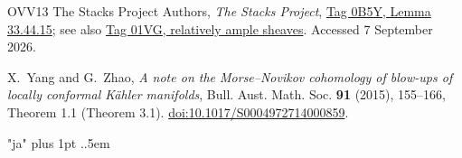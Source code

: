 \documentclass[12pt]{amsart}
\makeatletter
\theoremstyle{definition}
\theoremstyle{remark}
\numberwithin{equation}{section}
\newcommand{\MergedLanguage}{en}
\let\MergedSetAbstract\@setabstract
\newcommand{\MergedBegin}[1]{%
  \let\@setabstract\MergedSetAbstract
  \def\MergedLanguage{#1}%
  \gdef\authors{}\gdef\shortauthors{}\gdef\addresses{}%
  \gdef\thankses{}%
  \def\tableofcontents{\@starttoc{#1-toc}\contentsname}%
  \setcounter{section}{0}\setcounter{subsection}{0}\setcounter{subsubsection}{0}%
  \setcounter{paragraph}{0}\setcounter{subparagraph}{0}%
  \setcounter{thm}{0}\setcounter{equation}{0}%
  \setcounter{cl}{0}\setcounter{step}{0}\setcounter{case}{0}%
  \setcounter{figure}{0}\setcounter{table}{0}\setcounter{footnote}{0}%
  \renewcommand{\theHsection}{#1.\arabic{section}}%
  \renewcommand{\theHsubsection}{\theHsection.\arabic{subsection}}%
  \renewcommand{\theHsubsubsection}{\theHsubsection.\arabic{subsubsection}}%
  \renewcommand{\theHequation}{#1.\thesection.\arabic{equation}}%
  \def\theHthm{#1.\thesection.\arabic{thm}}%
  \def\theHfigure{#1.\arabic{figure}}%
  \def\theHtable{#1.\arabic{table}}%
  \def\theHfootnote{#1.\arabic{Hfootnote}}%
}
\makeatother
\begin{document}
\begin{thebibliography}{OVV13}
The Stacks Project Authors, \emph{The Stacks Project},
\href{https://stacks.math.columbia.edu/tag/0B5Y}{Tag 0B5Y, Lemma 33.44.15}; see also
\href{https://stacks.math.columbia.edu/tag/01VG}{Tag 01VG, relatively ample sheaves}. Accessed 7 September 2026.

X.~Yang and G.~Zhao, \emph{A note on the Morse--Novikov cohomology of blow-ups of locally conformal K\"ahler manifolds}, Bull. Aust. Math. Soc. \textbf{91} (2015), 155--166, Theorem 1.1 (Theorem 3.1).
\href{https://doi.org/10.1017/S0004972714000859}{doi:10.1017/S0004972714000859}.
\end{thebibliography}

\clearpage
\endgroup
\newpage
\begingroup
\MergedBegin{ja}

\renewcommand{\rmdefault}{\MergedJapaneseRomanFamily}
\normalfont
\ifXeTeX
  \XeTeXlinebreaklocale "ja"
  \XeTeXlinebreakskip=0pt plus 1pt
\else
\fi
{}
  {\normalfont}{}{\bfseries}{.}{.5em}{}
\theoremstyle{japaneseplain}

\newtheorem{MergedJAthm}[thm]{定理}
\newtheorem{MergedJAtheo}[thm]{定理}
\newtheorem{MergedJAcor}[thm]{系}
\newtheorem{MergedJAprop}[thm]{命題}
\newtheorem{MergedJAconj}[thm]{Conjecture}
\newtheorem*{MergedJAmainthm}{定理}

\newtheorem{MergedJAdeflem}[thm]{Definition-Lemma}
\newtheorem{MergedJAlem}[thm]{補題}

\theoremstyle{definition}
\newtheorem{MergedJAdefn}[thm]{定義}
\newtheorem{MergedJApropdefn}[thm]{Proposition-Definition}
\newtheorem{MergedJAlemdefn}[thm]{Lemma-Definition}
\newtheorem{MergedJAthmdefn}[thm]{Theorem-Definition}
\newtheorem{MergedJAeg}[thm]{例}
\newtheorem{MergedJAex}[thm]{例}
\newtheorem{MergedJAexa}[thm]{例}
\newtheorem{MergedJAques}[thm]{問い}
\newtheorem{MergedJAremin}[thm]{Reminder}

\theoremstyle{remark}
\newtheorem{MergedJArem}[thm]{注意}
\newtheorem{MergedJAsetup}[thm]{Setup}
\newtheorem{MergedJAobs}[thm]{Observation}
\newtheorem{MergedJAnotation}[thm]{Notation}
\newtheorem{MergedJAclaim}[thm]{Claim}
\newtheorem{MergedJAassup}[thm]{Assumption}
\newtheorem{MergedJAcln}[thm]{Claim}

\newtheorem{MergedJAcl}[cl]{Claim}
\newtheorem{MergedJAstep}[step]{Step}
\newtheorem{MergedJAcase}[case]{Case}
\end{document}
